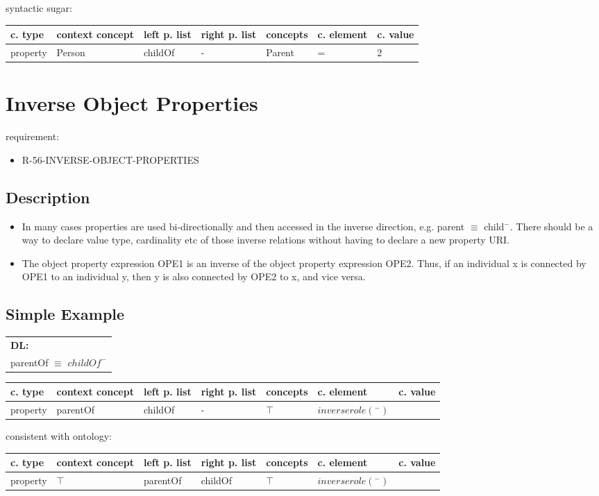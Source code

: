 \documentclass{llncs}
\newenvironment{gcotable}{
  \scriptsize
  \sffamily
  \vspace{0.3cm}
  \begin{tabular}{l|l|l|l|l|l|l}
  \hline
  \textbf{c. type} & \textbf{context concept} & \textbf{left p. list} & \textbf{right p. list} & \textbf{concepts} & \textbf{c. element} & \textbf{c. value} \\
  \hline

}{
  \hline
  \end{tabular}
  \linebreak
}
\newenvironment{DL}{
  \scriptsize
  \sffamily
  \vspace{0.3cm}
  \begin{tabular}{l}
	\textbf{DL:} \\

}{
  \end{tabular}
  \linebreak
}
\begin{document}
syntactic sugar:

\begin{gcotable}
property & Person & childOf & - & Parent & = & 2 \\
\end{gcotable}

\section{Inverse Object Properties}

requirement:

\begin{itemize}
	\item R-56-INVERSE-OBJECT-PROPERTIES
\end{itemize}

\subsection{Description}

\begin{itemize}
	\item In many cases properties are used bi-directionally and then accessed in the inverse direction, e.g. parent $\equiv$ child$^{-}$. There should be a way to declare value type, cardinality etc of those inverse relations without having to declare a new property URI. 
	\item The object property expression OPE1 is an inverse of the object property expression OPE2. Thus, if an individual x is connected by OPE1 to an individual y, then y is also connected by OPE2 to x, and vice versa.
\end{itemize}

\subsection{Simple Example}

\begin{DL}
parentOf $\equiv$ $childOf^{-}$ \\
\end{DL}

\begin{gcotable}
property & parentOf & childOf & - & $\top$ & $inverse role (^{-})$ \\
\end{gcotable}

consistent with ontology:

\begin{gcotable}
property & $\top$ & parentOf & childOf & $\top$ & $inverse role (^{-})$ \\
\end{gcotable}
\end{document}
